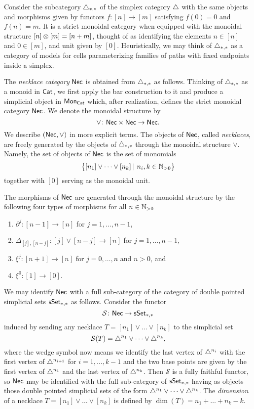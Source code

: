 Consider the subcategory $\triangle_{*,*}$ of the simplex category $\triangle$ with the same objects and morphisms given by functors $f \colon [n] \to [m]$ satisfying $f(0) = 0$ and $f(n) = m$.
It is a strict monoidal category when equipped with the monoidal structure $[n] \otimes [m] = [n+m]$, thought of as identifying the elements $n \in [n]$ and $0 \in [m]$, and unit given by $[0]$.
Heuristically, we may think of $\triangle_{*,*}$ as a category of models for cells parameterizing families of paths with fixed endpoints inside a simplex.


The \textit{necklace category} $\mathsf{Nec}$ is obtained from $\triangle_{*,*}$ as follows.
Thinking of $\triangle_{*,*}$ as a monoid in $\mathsf{Cat}$, we first apply the bar construction to it and produce a simplicial object in $\mathsf{Mon}_{\mathsf{Cat}}$ which, after realization, defines the strict monoidal category $\mathsf{Nec}$.
We denote the monoidal structure by
\[
\vee \colon \mathsf{Nec} \times \mathsf{Nec} \to \mathsf{Nec}.
\]
We describe $(\mathsf{Nec}, \vee)$ in more explicit terms.
The objects of $\mathsf{Nec}$, called \textit{necklaces}, are freely generated by the objects of $\triangle_{*,*}$ through the monoidal structure $\vee$.
Namely, the set of objects of $\mathsf{Nec}$ is the set of monomials
\[
\big\{ [n_1] \vee \dots \vee[n_k] \mid n_i, k \in \mathbb{N}_{>0} \big\}
\]
together with $[0]$ serving as the monoidal unit.

The morphisms of $\mathsf{Nec}$ are generated through the monoidal structure by the following four types of morphisms for all $n \in\mathbb{N}_{>0}$
\begin{enumerate}
	\item $\partial^j \colon [n-1] \to [n]$ for $j = 1, \dots, n-1$,
	\item $\Delta_{[j], [n-j]} \colon [j] \vee [n-j] \to [n]$ for $j = 1, \dots, n-1$,
	\item $\xi^j \colon [n+1] \to [n]$ for $j = 0, \dots, n$ and $n>0$, and
	\item $\xi^0 \colon [1] \to [0]$.
\end{enumerate}
We may identify $\mathsf{Nec}$ with a full sub-category of the category of double pointed simplicial sets $\mathsf{sSet}_{*,*}$ as follows.
Consider the functor
\[
\mathcal{S} \colon \mathsf{Nec} \to \mathsf{sSet}_{*,*}
\]
induced by sending any necklace $T = [n_1] \vee \dots \vee[n_k]$ to the simplicial set
\[
\mathcal{S}(T) = \triangle^{n_1} \vee \dots \vee \triangle^{n_k},
\]
where the wedge symbol now means we identify the last vertex of $\triangle^{n_i}$ with the first vertex of $\triangle^{n_{i+1}}$ for $i = 1, \dots, k-1$ and the two base points are given by the first vertex of $\triangle^{n_1}$ and the last vertex of $\triangle^{n_k}$.
Then $\mathcal{S}$ is a fully faithful functor, so $\mathsf{Nec}$ may be identified with the full sub-category of $\mathsf{sSet}_{*,*}$ having as objects those double pointed simplicial sets of the form $\triangle^{n_1} \vee \dots \vee \triangle^{n_k}$.
The \textit{dimension} of a necklace $T = [n_1] \vee \dots \vee[n_k]$ is defined by $\dim(T) = n_1 + \dots + n_k-k$.

